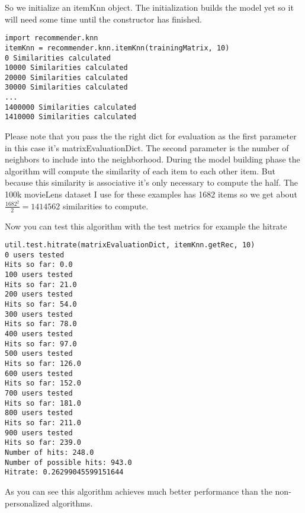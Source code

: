 So we initialize an itemKnn object. The initialization builds the model yet
so it will need some time until the constructor has finished.
\begin{lstlisting}
import recommender.knn
itemKnn = recommender.knn.itemKnn(trainingMatrix, 10)
0 Similarities calculated
10000 Similarities calculated
20000 Similarities calculated
30000 Similarities calculated
...
1400000 Similarities calculated
1410000 Similarities calculated
\end{lstlisting}
Please note that you pass the the right dict for evaluation as the first parameter
in this case it's matrixEvaluationDict.
The second parameter is the number of neighbors to include into the neighborhood.
During the model building phase the algorithm will compute the similarity of each
item to each other item. But because this similarity is associative it's only
necessary to compute the half. The 100k movieLens dataset I use for these examples
has 1682 items so we get about \begin{math} \frac{1682^2}{2} = 1414562 \end{math} 
similarities to compute.

Now you can test this algorithm with the test metrics for example the hitrate
\begin{lstlisting}
util.test.hitrate(matrixEvaluationDict, itemKnn.getRec, 10)
0 users tested
Hits so far: 0.0
100 users tested
Hits so far: 21.0
200 users tested
Hits so far: 54.0
300 users tested
Hits so far: 78.0
400 users tested
Hits so far: 97.0
500 users tested
Hits so far: 126.0
600 users tested
Hits so far: 152.0
700 users tested
Hits so far: 181.0
800 users tested
Hits so far: 211.0
900 users tested
Hits so far: 239.0
Number of hits: 248.0
Number of possible hits: 943.0
Hitrate: 0.26299045599151644
\end{lstlisting}
As you can see this algorithm achieves much better performance than the
non-personalized algorithms.

